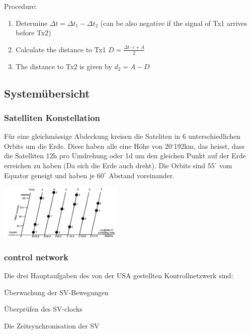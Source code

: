 	Procedure: \\
	\begin{enumerate}
		\item Determine $\Delta t = \Delta t_1 - \Delta t_2$ (can be also negative if the signal of Tx1 arrives before Tx2)
		\item Calculate the distance to Tx1 $D = \frac{\Delta t\cdot c + A}{2}$
		\item The distance to Tx2 is given by $d_2 = A-D$
		
	\end{enumerate}	
	
\subsection{Systemübersicht} 

    \begin{minipage}{13cm}
    \subsubsection{Satelliten Konstellation}    
	    Für eine gleichmässige Abdeckung kreisen die Sateliten in 6 unterschiedlichen
	    Orbits um die Erde. Diese haben alle eine Höhe von 20`192km, das
	    heisst, dass die Satelliten 12h pro Umdrehung oder 1d um den gleichen Punkt auf
	    der Erde erreichen zu haben (Da sich die Erde auch dreht). Die Orbits sind
	    $55^\circ$ vom Equator geneigt und haben je $60^\circ$ Abstand voreinander.    
    \end{minipage}
    \begin{minipage}{6cm}    
        \includegraphics[width=6cm]{./bilder/GPS-SatConstellation.png}    
    \end{minipage}
	
	\subsubsection{control network}
	Die drei Hauptaufgaben des von der USA gestellten Kontrollnetzwerk sind:
	\begin{liste}
    	\item Überwachung der SV-Bewegungen
    	\item Überprüfen des SV-clocks
    	\item Die Zeitsynchronisation der SV
    \end{liste} 
